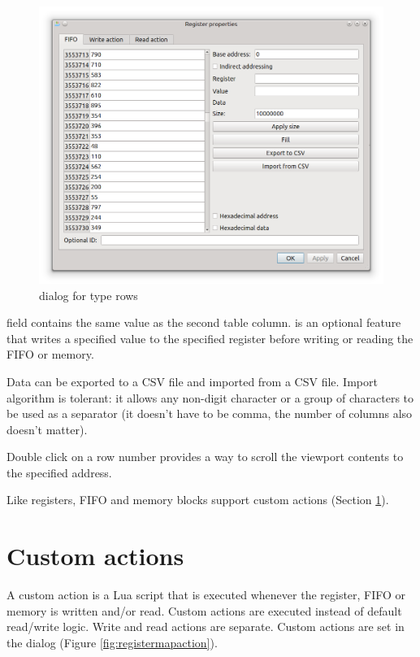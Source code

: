 \documentclass[a4paper,12pt,twoside,extrafontsizes]{memoir}
\begin{document}
\begin{figure}[htbp]
\centering
\includegraphics[scale=0.7]{images/registermapfifo.png}
\caption{ dialog for  type rows}
\label{fig:registermapfifo}
\end{figure}

 field contains the same value as the second table column.  is an optional feature that writes a specified value to the specified register before writing or reading the FIFO or memory.

Data can be exported to a CSV file and imported from a CSV file. Import algorithm is tolerant: it allows any non-digit character or a group of characters to be used as a separator (it doesn't have to be comma, the number of columns also doesn't matter).

Double click on a row number provides a way to scroll the viewport contents to the specified address.

Like registers, FIFO and memory blocks support custom actions (Section \ref{sec:customactions}).

\section{Custom actions}
\label{sec:customactions}

A custom action is a Lua script that is executed whenever the register, FIFO or memory is written and/or read. Custom actions are executed instead of default read/write logic. Write and read actions are separate. Custom actions are set in the  dialog (Figure \ref{fig:registermapaction}).
\end{document}
